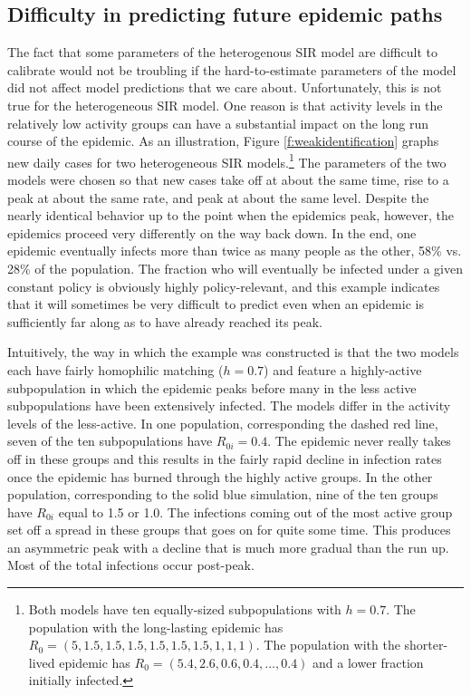 \documentclass[11pt]{article}
\begin{document}
\subsection{Difficulty in predicting future epidemic paths}

The fact that some parameters of the heterogenous SIR model are difficult to calibrate would not be troubling if the hard-to-estimate parameters of the model did not affect model predictions that we care about. Unfortunately, this is not true for the heterogeneous
SIR model. One reason is that activity levels in the relatively low activity groups can have a substantial impact on the long run course of
the epidemic. As an illustration, Figure \ref{f:weakidentification} graphs new daily cases for two heterogeneous SIR models.\footnote{Both models have ten equally-sized subpopulations with $h=0.7$.
The population with the long-lasting epidemic has $R_0 = (5, 1.5, 1.5, 1.5, 1.5, 1.5, 1.5, 1, 1, 1)$. The population with the shorter-lived epidemic has
$R_0=(5.4, 2.6, 0.6, 0.4, \ldots, 0.4)$ and
a lower fraction initially infected.} The parameters of the two models were chosen so that new cases take off at about the same time, rise to a peak at about the same rate, and peak at about the same level. 
Despite the nearly identical behavior up to the point when the epidemics peak, however, the epidemics proceed very differently on the way back down. In the end, one epidemic eventually infects more than twice as many people as the other, 58\% vs. 28\% of the population. The fraction who will eventually be infected under a given constant policy is obviously highly policy-relevant, and this example indicates that it will sometimes be very difficult to predict even when an epidemic is sufficiently far along as to have already reached its peak.

Intuitively, the way in which the example was constructed is that the two models each have fairly homophilic matching ($h=0.7$) and feature a highly-active subpopulation in which the epidemic peaks before many in the less active subpopulations have been extensively infected. The models differ in the 
activity levels of the less-active. In one population, corresponding the dashed red line, seven of the ten subpopulations have $R_{0i}=0.4$. The epidemic never really takes off in these groups and this results in the fairly rapid decline in infection rates once the epidemic has burned through the highly active groups. In the other population, corresponding to the solid blue simulation, nine of the ten groups have $R_{0i}$ equal to 1.5 or 1.0. The infections coming out of the most active group set off a spread in these groups that goes on for quite some time. This produces an asymmetric peak with a decline that is much more gradual than the run up. Most of the total infections occur post-peak. 
\end{document}
